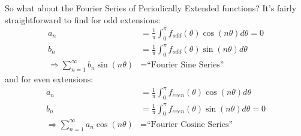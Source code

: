 So what about the Fourier Series of Periodically Extended
functions? It's
fairly straightforward to find for odd extensions:
\begin{subequations}
\begin{align}
a_{n} &=
\frac{1}{\pi}\int^{\pi}_{0}f_{odd}(\theta)\cos(n\theta)d\theta
= 0\\
b_{n} &=
\frac{1}{\pi}\int^{\pi}_{0}f_{odd}(\theta)\sin(n\theta)d\theta\\
\Rightarrow \sum^{\infty}_{n=1}b_{n}\sin(n\theta) &=
\text{``Fourier Sine Series''}
\end{align}
\end{subequations}
and for even extensions:
\begin{subequations}
\begin{align}
a_{n} &=
\frac{1}{\pi}\int^{\pi}_{0}f_{even}(\theta)\cos(n\theta)d\theta\\
b_{n} &=
\frac{1}{\pi}\int^{\pi}_{0}f_{even}(\theta)\sin(n\theta)d\theta=0\\
\Rightarrow \sum^{\infty}_{n=1}a_{n}\cos(n\theta) &=
\text{``Fourier Cosine Series''}
\end{align}
\end{subequations}
